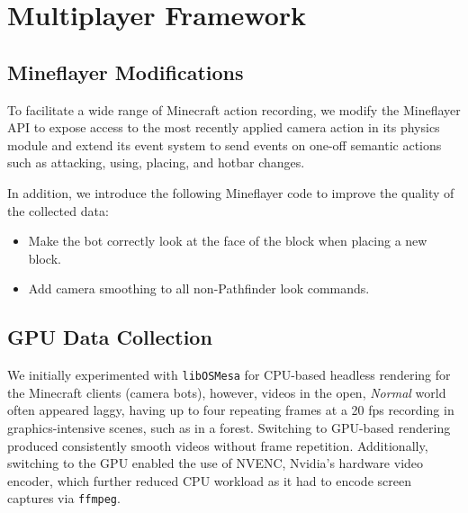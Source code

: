 \section{\solaris Multiplayer Framework}
\label{sec:data_engine_details}

\subsection{Mineflayer Modifications}
To facilitate a wide range of Minecraft action recording, we modify the Mineflayer API to expose access to the most recently applied camera action in its physics module and extend its event system to send events on one-off semantic actions such as attacking, using, placing, and hotbar changes.

In addition, we introduce the following Mineflayer code to improve the quality of the collected data: 
\begin{itemize}[noitemsep, topsep=0pt]
  \item Make the bot correctly look at the face of the block when placing a new block.
  \item Add camera smoothing to all non-Pathfinder look commands.
\end{itemize}






\subsection{GPU Data Collection}

We initially experimented with \texttt{libOSMesa} for CPU-based headless rendering for the Minecraft clients (camera bots), however, videos in the open, \textit{Normal} world often appeared laggy, having up to four repeating frames at a 20 fps recording in graphics-intensive scenes, such as in a forest. Switching to GPU-based rendering produced consistently smooth videos without frame repetition. Additionally, switching to the GPU enabled the use of NVENC, Nvidia's hardware video encoder, which further reduced CPU workload as it had to encode screen captures via \texttt{ffmpeg}.
